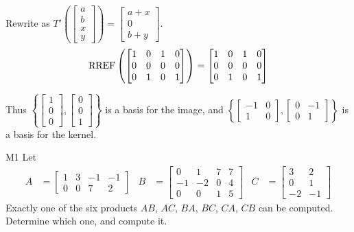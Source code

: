 \documentclass{sbgLAsemi}
\begin{document}
\begin{solution}
Rewrite as \(
  T'\left(\begin{bmatrix} a \\ b \\ x \\ y \end{bmatrix} \right) =
  \begin{bmatrix}
    a+x \\ 0 \\ b+y
  \end{bmatrix}
\).
\[
  \operatorname{RREF} \left( \begin{bmatrix}
    1 & 0 & 1 & 0 \\
    0 & 0 & 0 & 0 \\
    0 & 1 & 0 & 1
  \end{bmatrix} \right) = \begin{bmatrix}
    1 & 0 & 1 & 0 \\
    0 & 0 & 0 & 0 \\
    0 & 1 & 0 & 1
  \end{bmatrix}
\]

Thus \(\left\{
  \begin{bmatrix} 1 \\ 0 \\ 0 \end{bmatrix},
  \begin{bmatrix} 0 \\ 0 \\ 1 \end{bmatrix}
\right\} \) is a basis for the image, and \(\left\{
  \begin{bmatrix} -1 & 0 \\ 1 & 0 \end{bmatrix},
  \begin{bmatrix} 0 & -1 \\ 0 & 1 \end{bmatrix}
\right\} \) is a basis for the kernel.
\end{solution}
\begin{problem}{M1}
Let 
\begin{align*}
A &= \begin{bmatrix} 1 & 3 & -1 & -1 \\ 0 & 0 & 7 & 2 \end{bmatrix} & B &= \begin{bmatrix} 0 & 1 & 7 & 7 \\ -1 & -2 & 0 & 4 \\ 0 & 0 & 1 & 5 \end{bmatrix} & C&=\begin{bmatrix} 3 & 2 \\ 0 & 1 \\ -2 & -1 \end{bmatrix}
\end{align*}
Exactly one of the six products $AB$, $AC$, $BA$, $BC$, $CA$, $CB$ can be computed.  Determine which one, and compute it.
\end{problem}
\end{document}
